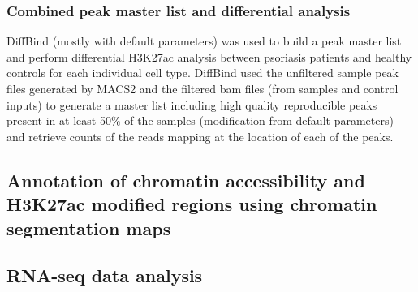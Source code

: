 \subsubsection{Combined peak master list and differential analysis}
DiffBind (mostly with default parameters) was used to build a peak master list and perform differential H3K27ac analysis between psoriasis patients and healthy controls for each individual cell type. DiffBind used the unfiltered sample peak files generated by MACS2 and the filtered bam files (from samples and control inputs) to generate a master list including high quality reproducible peaks present in at least 50\% of the samples (modification from default parameters) and retrieve counts of the reads mapping at the location of each of the peaks.

\subsection{Annotation of chromatin accessibility and H3K27ac modified regions using chromatin segmentation maps}



\subsection{RNA-seq data analysis}

